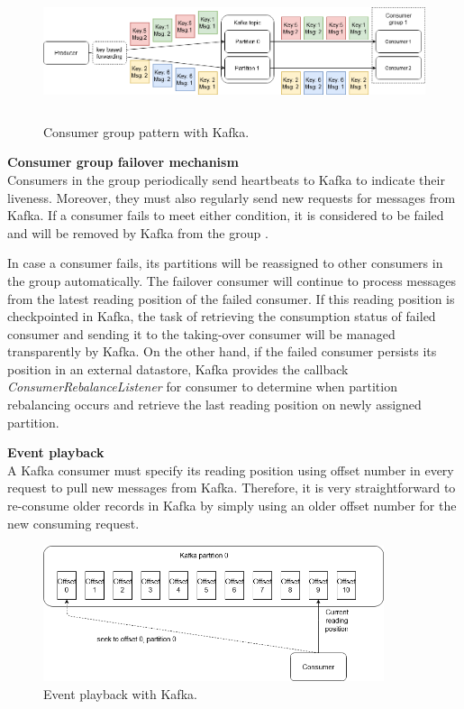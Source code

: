 \begin{figure}[h]
	\centering
	\includegraphics[width=\linewidth,height=4cm]{images/consumer-group-kafka.png}
	\caption{Consumer group pattern with Kafka.}
	\label{fig:kafkaconsumergroup}
\end{figure}


\textbf{Consumer group failover mechanism}\\
Consumers in the group periodically send heartbeats to Kafka to indicate their liveness. Moreover, they must also regularly send new requests for messages from Kafka. If a consumer fails to meet either condition, it is considered to be failed and will be removed by Kafka from the group \cite{kafkaconsumerimplement}. 

In case a consumer fails, its partitions will be reassigned to other consumers in the group automatically. The failover consumer will continue to process messages from the latest reading position of the failed consumer. If this reading position is checkpointed in Kafka, the task of retrieving the consumption status of failed consumer and sending it to the taking-over consumer will be managed transparently by Kafka. On the other hand, if the failed consumer persists its position in an external datastore, Kafka provides the callback \emph{ConsumerRebalanceListener} for consumer to determine when partition rebalancing occurs and retrieve the last reading position on newly assigned partition.

\textbf{Event playback}\\
A Kafka consumer must specify its reading position using offset number in every request to pull new messages from Kafka. Therefore, it is very straightforward to re-consume older records in Kafka by simply using an older offset number for the new consuming request. 

\begin{figure}[h]
	\centering
	\includegraphics[width=10cm,height=4cm]{images/event-playback-kafka.png}
	\caption{Event playback with Kafka.}
	\label{fig:kafkaeventplayback}
\end{figure}


